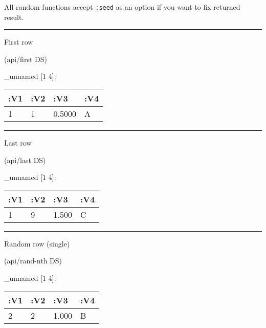 \documentclass[]{article}
\newenvironment{Shaded}{\begin{snugshade}}{\end{snugshade}}
\newcommand{\NormalTok}[1]{#1}
\begin{document}
All random functions accept \texttt{:seed} as an option if you want to
fix returned result.

\begin{center}\rule{0.5\linewidth}{0.5pt}\end{center}

First row

\begin{Shaded}
\begin{Highlighting}[]
\NormalTok{(api/first DS)}
\end{Highlighting}
\end{Shaded}

\_unnamed {[}1 4{]}:

\begin{longtable}[]{@{}llll@{}}
\toprule
:V1 & :V2 & :V3 & :V4\tabularnewline
\midrule
\endhead
1 & 1 & 0.5000 & A\tabularnewline
\bottomrule
\end{longtable}

\begin{center}\rule{0.5\linewidth}{0.5pt}\end{center}

Last row

\begin{Shaded}
\begin{Highlighting}[]
\NormalTok{(api/last DS)}
\end{Highlighting}
\end{Shaded}

\_unnamed {[}1 4{]}:

\begin{longtable}[]{@{}llll@{}}
\toprule
:V1 & :V2 & :V3 & :V4\tabularnewline
\midrule
\endhead
1 & 9 & 1.500 & C\tabularnewline
\bottomrule
\end{longtable}

\begin{center}\rule{0.5\linewidth}{0.5pt}\end{center}

Random row (single)

\begin{Shaded}
\begin{Highlighting}[]
\NormalTok{(api/rand-nth DS)}
\end{Highlighting}
\end{Shaded}

\_unnamed {[}1 4{]}:

\begin{longtable}[]{@{}llll@{}}
\toprule
:V1 & :V2 & :V3 & :V4\tabularnewline
\midrule
\endhead
2 & 2 & 1.000 & B\tabularnewline
\bottomrule
\end{longtable}
\end{document}
